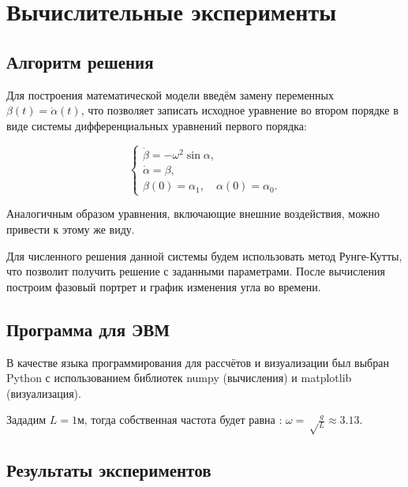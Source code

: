 \chapter{Вычислительные эксперименты}
\section{Алгоритм решения}
Для построения математической модели введём замену переменных $\beta(t) = \dot{\alpha}(t)$, что позволяет записать исходное уравнение во втором порядке в виде системы дифференциальных уравнений первого порядка:

\[
\begin{cases}
	\dot{\beta} = -\omega^2 \sin \alpha, \\
	\dot{\alpha} = \beta, \\
	\beta(0) = \alpha_1, \quad \alpha(0) = \alpha_0.
\end{cases}
\]

Аналогичным образом уравнения, включающие внешние воздействия, можно привести к этому же виду.

Для численного решения данной системы будем использовать метод Рунге-Кутты\cite{1964calculus}, что позволит получить решение с заданными параметрами. После вычисления построим фазовый портрет и график изменения угла во времени.

\section{Программа для ЭВМ}
В качестве языка программирования для рассчётов и визуализации был выбран Python с использованием библиотек numpy (вычисления) и matplotlib (визуализация).

 

Зададим $L = 1\text{м}$, тогда собственная частота будет равна : $\omega = \sqrt\frac{g}{L} \approx 3.13$.
\section{Результаты  экспериментов}
